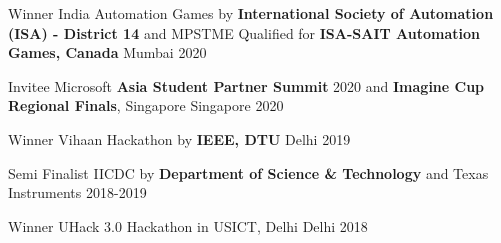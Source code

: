 



\smallskip


\begin{cvhonors}

  \cvhonor
    {Winner} %
    {India Automation Games by  \textbf{International Society of Automation (ISA) - District 14} and MPSTME
    \newline
    Qualified for \textbf{ISA-SAIT Automation Games, Canada}} %
    {Mumbai} %
    {2020} %

  \cvhonor
    {Invitee} %
    {Microsoft \textbf{Asia Student Partner Summit} 2020 and \textbf{Imagine Cup Regional Finals}, Singapore} %
    {Singapore} %
    {2020} %

  \cvhonor
    {Winner} %
    {Vihaan Hackathon by \textbf{IEEE, DTU}} %
    {Delhi} %
    {2019} %

  \cvhonor
    {Semi Finalist} %
    {IICDC by \textbf{Department of Science \& Technology} and Texas Instruments} %
    {} %
    {2018-2019} %

  \cvhonor
    {Winner} %
    {UHack 3.0 Hackathon in USICT, Delhi} %
    {Delhi} %
    {2018} %

\end{cvhonors}